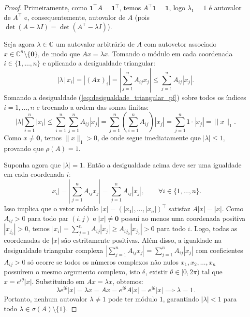 \documentclass[10pt,a4paper]{article}
\theoremstyle{definition}
\theoremstyle{plain}
\theoremstyle{remark}
\begin{document}
\begin{proof}
Primeiramente, como $\mathbf{1}^{\top} A = \mathbf{1}^{\top}$, temos $A^{\top} \mathbf{1} = \mathbf{1}$, logo $\lambda_1 = 1$ é autovalor de $A^{\top}$ e, consequentemente, autovalor de $A$ (pois $\det(A - \lambda I) = \det(A^{\top} - \lambda I)$).

Seja agora $\lambda \in \mathbb{C}$ um autovalor arbitrário de $A$ com autovetor associado $x \in \mathbb{C}^n \setminus \{\mathbf{0}\}$, de modo que $A x = \lambda x$. Tomando o módulo em cada coordenada $i \in \{1, \dots, n\}$ e aplicando a desigualdade triangular:
\begin{equation}
|\lambda| |x_i| = |(Ax)_i| = \left| \sum_{j=1}^{n} A_{ij} x_j \right| \le \sum_{j=1}^{n} A_{ij} |x_j|.
\label{eq:desigualdade_triangular_pf}
\end{equation}
Somando a desigualdade (\ref{eq:desigualdade_triangular_pf}) sobre todos os índices $i = 1, \dots, n$ e trocando a ordem das somas finitas:
\[
|\lambda| \sum_{i=1}^{n} |x_i| \le \sum_{i=1}^{n} \sum_{j=1}^{n} A_{ij} |x_j| = \sum_{j=1}^{n} \left( \sum_{i=1}^{n} A_{ij} \right) |x_j| = \sum_{j=1}^{n} 1 \cdot |x_j| = \|x\|_1.
\]
Como $x \neq \mathbf{0}$, temos $\|x\|_1 > 0$, de onde segue imediatamente que $|\lambda| \le 1$, provando que $\rho(A) = 1$.

Suponha agora que $|\lambda| = 1$. Então a desigualdade acima deve ser uma igualdade em cada coordenada $i$:
\[
|x_i| = \left| \sum_{j=1}^{n} A_{ij} x_j \right| = \sum_{j=1}^{n} A_{ij} |x_j|, \qquad \forall i \in \{1, \dots, n\}.
\]
Isso implica que o vetor módulo $|x| = (|x_1|, \dots, |x_n|)^{\top}$ satisfaz $A |x| = |x|$. Como $A_{ij} > 0$ para todo par $(i, j)$ e $|x| \neq \mathbf{0}$ possui ao menos uma coordenada positiva $|x_{j_0}| > 0$, temos $|x_i| = \sum_{j=1}^{n} A_{ij} |x_j| \ge A_{ij_0} |x_{j_0}| > 0$ para todo $i$. Logo, todas as coordenadas de $|x|$ são estritamente positivas. Além disso, a igualdade na desigualdade triangular complexa $|\sum_{j=1}^n A_{ij} x_j| = \sum_{j=1}^n A_{ij} |x_j|$ com coeficientes $A_{ij} > 0$ só ocorre se todos os números complexos não nulos $x_1, x_2, \dots, x_n$ possuírem o mesmo argumento complexo, isto é, existir $\theta \in [0, 2\pi)$ tal que $x = e^{i\theta} |x|$. Substituindo em $Ax = \lambda x$, obtemos:
\[
\lambda e^{i\theta} |x| = \lambda x = A x = e^{i\theta} A |x| = e^{i\theta} |x| \implies \lambda = 1.
\]
Portanto, nenhum autovalor $\lambda \neq 1$ pode ter módulo $1$, garantindo $|\lambda| < 1$ para todo $\lambda \in \sigma(A) \setminus \{1\}$.


\end{proof}
\end{document}
